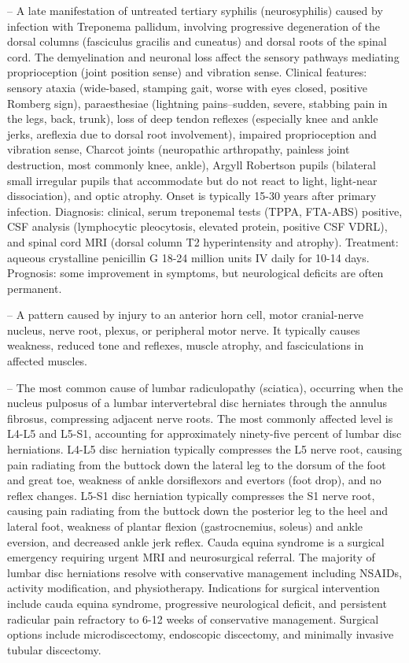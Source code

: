 -- A late manifestation of untreated tertiary syphilis (neurosyphilis) caused by infection with Treponema pallidum, involving progressive degeneration of the dorsal columns (fasciculus gracilis and cuneatus) and dorsal roots of the spinal cord. The demyelination and neuronal loss affect the sensory pathways mediating proprioception (joint position sense) and vibration sense. Clinical features: sensory ataxia (wide-based, stamping gait, worse with eyes closed, positive Romberg sign), paraesthesiae (lightning pains--sudden, severe, stabbing pain in the legs, back, trunk), loss of deep tendon reflexes (especially knee and ankle jerks, areflexia due to dorsal root involvement), impaired proprioception and vibration sense, Charcot joints (neuropathic arthropathy, painless joint destruction, most commonly knee, ankle), Argyll Robertson pupils (bilateral small irregular pupils that accommodate but do not react to light, light-near dissociation), and optic atrophy. Onset is typically 15-30 years after primary infection. Diagnosis: clinical, serum treponemal tests (TPPA, FTA-ABS) positive, CSF analysis (lymphocytic pleocytosis, elevated protein, positive CSF VDRL), and spinal cord MRI (dorsal column T2 hyperintensity and atrophy). Treatment: aqueous crystalline penicillin G 18-24 million units IV daily for 10-14 days. Prognosis: some improvement in symptoms, but neurological deficits are often permanent.

-- A pattern caused by injury to an anterior horn cell, motor cranial-nerve nucleus, nerve root, plexus, or peripheral motor nerve. It typically causes weakness, reduced tone and reflexes, muscle atrophy, and fasciculations in affected muscles.

-- The most common cause of lumbar radiculopathy (sciatica), occurring when the nucleus pulposus of a lumbar intervertebral disc herniates through the annulus fibrosus, compressing adjacent nerve roots. The most commonly affected level is L4-L5 and L5-S1, accounting for approximately ninety-five percent of lumbar disc herniations. L4-L5 disc herniation typically compresses the L5 nerve root, causing pain radiating from the buttock down the lateral leg to the dorsum of the foot and great toe, weakness of ankle dorsiflexors and evertors (foot drop), and no reflex changes. L5-S1 disc herniation typically compresses the S1 nerve root, causing pain radiating from the buttock down the posterior leg to the heel and lateral foot, weakness of plantar flexion (gastrocnemius, soleus) and ankle eversion, and decreased ankle jerk reflex. Cauda equina syndrome is a surgical emergency requiring urgent MRI and neurosurgical referral. The majority of lumbar disc herniations resolve with conservative management including NSAIDs, activity modification, and physiotherapy. Indications for surgical intervention include cauda equina syndrome, progressive neurological deficit, and persistent radicular pain refractory to 6-12 weeks of conservative management. Surgical options include microdiscectomy, endoscopic discectomy, and minimally invasive tubular discectomy.

